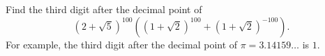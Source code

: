 Find the third digit after the decimal point of
$$ (2 + \sqrt{5})^{100} ((1 + \sqrt{2})^{100} + (1 + \sqrt{2})^{-100}). $$
For example, the third digit after the decimal point of $\pi = 3.14159 \dots$
is $1$.

